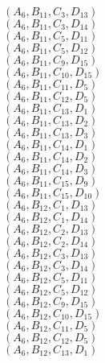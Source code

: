 \documentclass[14pt]{article}
\begin{document}
    $({A}_{6}, {B}_{11}, {C}_{3}, {D}_{13}) $ \\ 
    $({A}_{6}, {B}_{11}, {C}_{3}, {D}_{14}) $ \\ 
    $({A}_{6}, {B}_{11}, {C}_{5}, {D}_{11}) $ \\ 
    $({A}_{6}, {B}_{11}, {C}_{5}, {D}_{12}) $ \\ 
    $({A}_{6}, {B}_{11}, {C}_{9}, {D}_{15}) $ \\ 
    $({A}_{6}, {B}_{11}, {C}_{10}, {D}_{15}) $ \\ 
    $({A}_{6}, {B}_{11}, {C}_{11}, {D}_{5}) $ \\ 
    $({A}_{6}, {B}_{11}, {C}_{12}, {D}_{5}) $ \\ 
    $({A}_{6}, {B}_{11}, {C}_{13}, {D}_{1}) $ \\ 
    $({A}_{6}, {B}_{11}, {C}_{13}, {D}_{2}) $ \\ 
    $({A}_{6}, {B}_{11}, {C}_{13}, {D}_{3}) $ \\ 
    $({A}_{6}, {B}_{11}, {C}_{14}, {D}_{1}) $ \\ 
    $({A}_{6}, {B}_{11}, {C}_{14}, {D}_{2}) $ \\ 
    $({A}_{6}, {B}_{11}, {C}_{14}, {D}_{3}) $ \\ 
    $({A}_{6}, {B}_{11}, {C}_{15}, {D}_{9}) $ \\ 
    $({A}_{6}, {B}_{11}, {C}_{15}, {D}_{10}) $ \\ 
    $({A}_{6}, {B}_{12}, {C}_{1}, {D}_{13}) $ \\ 
    $({A}_{6}, {B}_{12}, {C}_{1}, {D}_{14}) $ \\ 
    $({A}_{6}, {B}_{12}, {C}_{2}, {D}_{13}) $ \\ 
    $({A}_{6}, {B}_{12}, {C}_{2}, {D}_{14}) $ \\ 
    $({A}_{6}, {B}_{12}, {C}_{3}, {D}_{13}) $ \\ 
    $({A}_{6}, {B}_{12}, {C}_{3}, {D}_{14}) $ \\ 
    $({A}_{6}, {B}_{12}, {C}_{5}, {D}_{11}) $ \\ 
    $({A}_{6}, {B}_{12}, {C}_{5}, {D}_{12}) $ \\ 
    $({A}_{6}, {B}_{12}, {C}_{9}, {D}_{15}) $ \\ 
    $({A}_{6}, {B}_{12}, {C}_{10}, {D}_{15}) $ \\ 
    $({A}_{6}, {B}_{12}, {C}_{11}, {D}_{5}) $ \\ 
    $({A}_{6}, {B}_{12}, {C}_{12}, {D}_{5}) $ \\ 
    $({A}_{6}, {B}_{12}, {C}_{13}, {D}_{1}) $ \\ 
\end{document}
